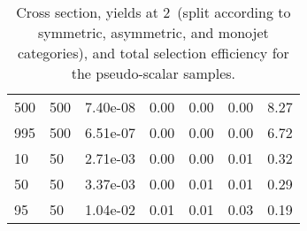 \begin{table}
\begin{tabular}{lllllll}
500       &   500       &   7.40e-08  &   0.00      &   0.00      &   0.00      &   8.27      \\ 
995       &   500       &   6.51e-07  &   0.00      &   0.00      &   0.00      &   6.72      \\ 
10        &   50        &   2.71e-03  &   0.00      &   0.00      &   0.01      &   0.32      \\ 
50        &   50        &   3.37e-03  &   0.00      &   0.01      &   0.01      &   0.29      \\ 
95        &   50        &   1.04e-02  &   0.01      &   0.01      &   0.03      &   0.19      \\ 
\hline
\end{tabular}
\caption{Cross section, yields at 2~\ifb (split according to symmetric, asymmetric, and monojet categories), and total selection efficiency for the pseudo-scalar \DMtt samples.}
\label{summaryTableAN_DMbbS_xs10_2p1fb_exp}
\end{table}
